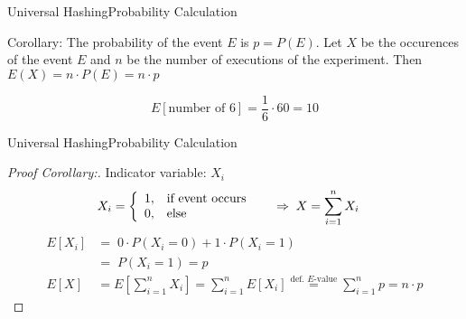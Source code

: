 
\begin{frame}{Universal Hashing}{Probability Calculation}
  \begin{block}{Corollary:}
    The probability of the event $E$ is $p = P(E)$.
    Let $X$ be the occurences of the event $E$ and $n$ be the number
    of executions of the experiment. Then {\color{Mittel-Blau}$E(X) = n \cdot P(E) = n \cdot p$}
  \end{block}
  \begin{example}
    \[E\left[\text{number of 6}\right] = \frac{1}{6} \cdot 60 = 10\]
  \end{example}
\end{frame}


\begin{frame}{Universal Hashing}{Probability Calculation}
  \begin{proof}[Proof Corollary:]
    Indicator variable: {\color{Mittel-Blau}$X_i$}\\
    \vspace*{-1.5em}
    {\color{Mittel-Blau}
    \begin{align*}
      X_i &=
        \left\lbrace
          \begin{array}{ll}
            1, & \text{if event occurs}\\
            0, & \text{else}
          \end{array}
        \right. \hspace{1.5em}
        \Rightarrow \; X = \sum_{i=1}^{n} X_i
    \end{align*}}
    \vspace*{-1.0em}
    {\color{Mittel-Blau}
    \begin{align*}
      E[X_i]
        &= \; 0 \cdot P(X_i = 0) + 1 \cdot P(X_i = 1)\\
      {} &= \; P(X_i = 1) = p\\[0.5em]
      E[X] &= E\left[\sum_{i=1}^{n} X_i\right]
        = \sum_{i=1}^{n} E[X_i]
        \stackrel{\text{def. $E$-value}}{=}
        \sum_{i=1}^{n} p = n \cdot p
    \end{align*}}
    \qedhere
  \end{proof}
\end{frame}
